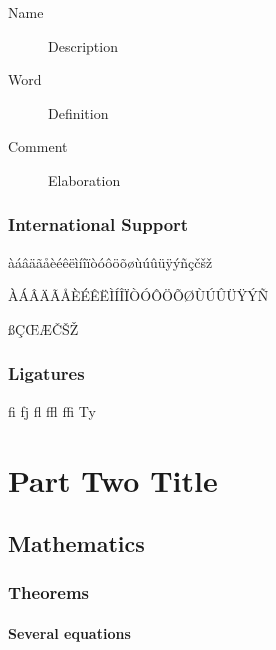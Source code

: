 \documentclass[
	11pt, %
	fleqn, %
	a4paper, %
]{LegrandOrangeBook}
\begin{document}
\begin{description}
	\item[Name] Description
	\item[Word] Definition
	\item[Comment] Elaboration
\end{description}


\section{International Support}

àáâäãåèéêëìíîïòóôöõøùúûüÿýñçčšž

\noindent ÀÁÂÄÃÅÈÉÊËÌÍÎÏÒÓÔÖÕØÙÚÛÜŸÝÑ

\noindent ßÇŒÆČŠŽ


\section{Ligatures}

fi fj fl ffl ffi Ty


\part{Part Two Title}


\chapter{Mathematics}

\section{Theorems}

\subsection{Several equations}
\end{document}
